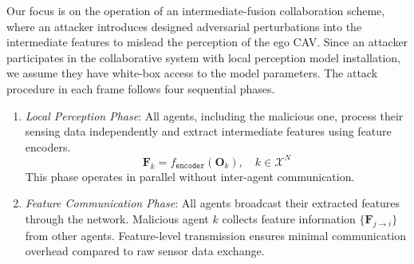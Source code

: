 Our focus is on the operation of an  intermediate-fusion collaboration scheme, where an attacker introduces designed adversarial perturbations into the intermediate features to mislead the perception of the ego CAV. Since an attacker participates in the collaborative system with local perception model installation, we assume they have white-box access to the model parameters. The attack procedure in each frame follows four sequential phases.
\begin{enumerate}
    \vspace{-4mm}
    \setlength{\itemsep}{0pt}
    \setlength{\parskip}{0pt}
    \setlength{\parsep}{0pt}
    \item \textit{Local Perception Phase}: All agents, including the malicious one, process their sensing data independently and extract intermediate features using feature encoders. 
    \vspace{-1mm}
    \begin{equation}
    \mathbf{F}_k = f_\mathtt{encoder}(\mathbf{O}_k), \quad k \in \mathcal{X}^N
    \end{equation}
    \vspace{-1mm}
    This phase operates in parallel without inter-agent communication.

    \item \textit{Feature Communication Phase}: All agents broadcast their extracted features through the network. Malicious agent $k$ collects feature information $\{\mathbf{F}_{j\rightarrow i}\}$ from other agents. Feature-level transmission ensures minimal communication overhead compared to raw sensor data exchange.


\end{enumerate}
